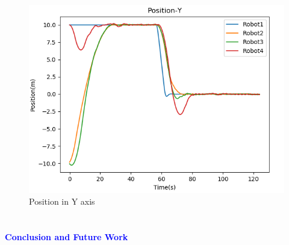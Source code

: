 \documentclass[10pt]{beamer}
\begin{document}
\begin{frame}
\begin{minipage}{0.47\textwidth}
\begin{figure}[h!]
			\includegraphics[scale=0.27]{Position-Y-minmax.png}
			\caption{Position in Y axis}
			\label{Fig:pos_y_m}
		\end{figure}
	\end{minipage}
\end{frame}


\section*{}
\begin{frame}{}
	\huge{\centerline{\textcolor{blue}{\textbf{Conclusion and Future Work}}}}
\end{frame}
\end{document}
